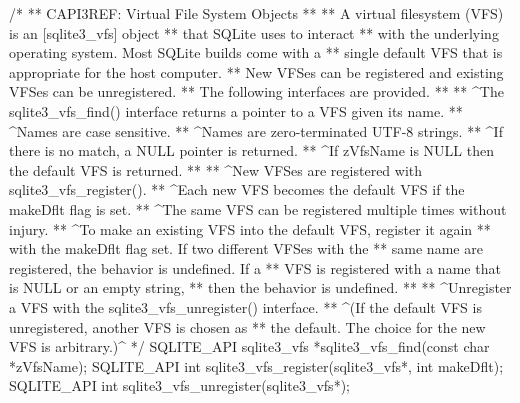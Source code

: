\begin{Codex}[label=sqlite3.h,numbers=left]
{/*
** CAPI3REF: Virtual File System Objects
**
** A virtual filesystem (VFS) is an [sqlite3_vfs] object
** that SQLite uses to interact
** with the underlying operating system.  Most SQLite builds come with a
** single default VFS that is appropriate for the host computer.
** New VFSes can be registered and existing VFSes can be unregistered.
** The following interfaces are provided.
**
** ^The sqlite3_vfs_find() interface returns a pointer to a VFS given its name.
** ^Names are case sensitive.
** ^Names are zero-terminated UTF-8 strings.
** ^If there is no match, a NULL pointer is returned.
** ^If zVfsName is NULL then the default VFS is returned.
**
** ^New VFSes are registered with sqlite3_vfs_register().
** ^Each new VFS becomes the default VFS if the makeDflt flag is set.
** ^The same VFS can be registered multiple times without injury.
** ^To make an existing VFS into the default VFS, register it again
** with the makeDflt flag set.  If two different VFSes with the
** same name are registered, the behavior is undefined.  If a
** VFS is registered with a name that is NULL or an empty string,
** then the behavior is undefined.
**
** ^Unregister a VFS with the sqlite3_vfs_unregister() interface.
** ^(If the default VFS is unregistered, another VFS is chosen as
** the default.  The choice for the new VFS is arbitrary.)^
*/
SQLITE_API sqlite3_vfs *sqlite3_vfs_find(const char *zVfsName);
SQLITE_API int sqlite3_vfs_register(sqlite3_vfs*, int makeDflt);
SQLITE_API int sqlite3_vfs_unregister(sqlite3_vfs*);

}
\end{Codex}
